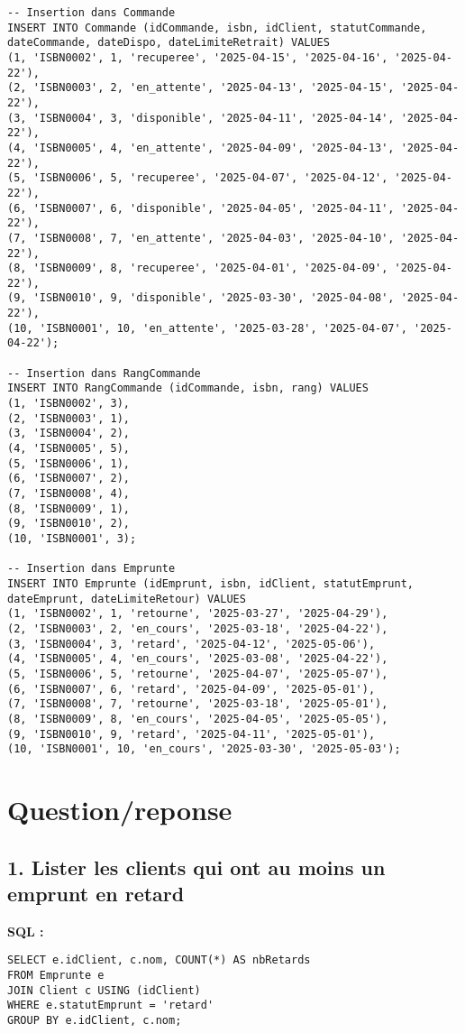\documentclass{article}
\begin{document}
\begin{lstlisting}
-- Insertion dans Commande
INSERT INTO Commande (idCommande, isbn, idClient, statutCommande, dateCommande, dateDispo, dateLimiteRetrait) VALUES
(1, 'ISBN0002', 1, 'recuperee', '2025-04-15', '2025-04-16', '2025-04-22'),
(2, 'ISBN0003', 2, 'en_attente', '2025-04-13', '2025-04-15', '2025-04-22'),
(3, 'ISBN0004', 3, 'disponible', '2025-04-11', '2025-04-14', '2025-04-22'),
(4, 'ISBN0005', 4, 'en_attente', '2025-04-09', '2025-04-13', '2025-04-22'),
(5, 'ISBN0006', 5, 'recuperee', '2025-04-07', '2025-04-12', '2025-04-22'),
(6, 'ISBN0007', 6, 'disponible', '2025-04-05', '2025-04-11', '2025-04-22'),
(7, 'ISBN0008', 7, 'en_attente', '2025-04-03', '2025-04-10', '2025-04-22'),
(8, 'ISBN0009', 8, 'recuperee', '2025-04-01', '2025-04-09', '2025-04-22'),
(9, 'ISBN0010', 9, 'disponible', '2025-03-30', '2025-04-08', '2025-04-22'),
(10, 'ISBN0001', 10, 'en_attente', '2025-03-28', '2025-04-07', '2025-04-22');

-- Insertion dans RangCommande
INSERT INTO RangCommande (idCommande, isbn, rang) VALUES
(1, 'ISBN0002', 3),
(2, 'ISBN0003', 1),
(3, 'ISBN0004', 2),
(4, 'ISBN0005', 5),
(5, 'ISBN0006', 1),
(6, 'ISBN0007', 2),
(7, 'ISBN0008', 4),
(8, 'ISBN0009', 1),
(9, 'ISBN0010', 2),
(10, 'ISBN0001', 3);

-- Insertion dans Emprunte
INSERT INTO Emprunte (idEmprunt, isbn, idClient, statutEmprunt, dateEmprunt, dateLimiteRetour) VALUES
(1, 'ISBN0002', 1, 'retourne', '2025-03-27', '2025-04-29'),
(2, 'ISBN0003', 2, 'en_cours', '2025-03-18', '2025-04-22'),
(3, 'ISBN0004', 3, 'retard', '2025-04-12', '2025-05-06'),
(4, 'ISBN0005', 4, 'en_cours', '2025-03-08', '2025-04-22'),
(5, 'ISBN0006', 5, 'retourne', '2025-04-07', '2025-05-07'),
(6, 'ISBN0007', 6, 'retard', '2025-04-09', '2025-05-01'),
(7, 'ISBN0008', 7, 'retourne', '2025-03-18', '2025-05-01'),
(8, 'ISBN0009', 8, 'en_cours', '2025-04-05', '2025-05-05'),
(9, 'ISBN0010', 9, 'retard', '2025-04-11', '2025-05-01'),
(10, 'ISBN0001', 10, 'en_cours', '2025-03-30', '2025-05-03');
\end{lstlisting}

\section{Question/reponse}
\subsection*{1. Lister les clients qui ont au moins un emprunt en retard}

\textbf{SQL :}
\begin{lstlisting}
SELECT e.idClient, c.nom, COUNT(*) AS nbRetards
FROM Emprunte e
JOIN Client c USING (idClient)
WHERE e.statutEmprunt = 'retard'
GROUP BY e.idClient, c.nom;
\end{lstlisting}
\end{document}
